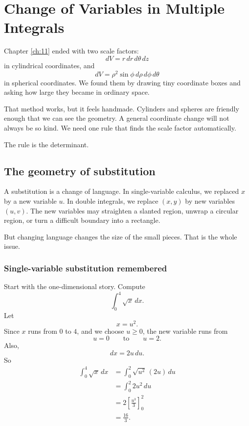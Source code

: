 
\chapter{Change of Variables in Multiple Integrals}
\label{ch:12}

Chapter \ref{ch:11} ended with two scale factors:
\[
    dV=r\,dr\,d\theta\,dz
\]
in cylindrical coordinates, and
\[
    dV=\rho^2\sin\phi\,d\rho\,d\phi\,d\theta
\]
in spherical coordinates.  We found them by drawing tiny coordinate boxes and asking
how large they became in ordinary space.

That method works, but it feels handmade.  Cylinders and spheres are friendly enough
that we can see the geometry.  A general coordinate change will not always be so kind.
We need one rule that finds the scale factor automatically.

The rule is the determinant.

\section{The geometry of substitution}
\label{sec:12.1}

A substitution is a change of language.  In single-variable calculus, we replaced \(x\)
by a new variable \(u\).  In double integrals, we replace \((x,y)\) by new variables
\((u,v)\).  The new variables may straighten a slanted region, unwrap a circular region,
or turn a difficult boundary into a rectangle.

But changing language changes the size of the small pieces.  That is the whole issue.

\subsection{Single-variable substitution remembered}

Start with the one-dimensional story.  Compute
\[
    \int_0^4 \sqrt{x}\,dx.
\]
Let
\[
    x=u^2.
\]
Since \(x\) runs from \(0\) to \(4\), and we choose \(u\ge0\), the new variable runs from
\[
    u=0
    \qquad\text{to}\qquad
    u=2.
\]
Also,
\[
    dx=2u\,du.
\]
So
\[
\begin{aligned}
    \int_0^4 \sqrt{x}\,dx
    &=
    \int_0^2 \sqrt{u^2}\,(2u)\,du\\
    &=
    \int_0^2 2u^2\,du\\
    &=
    2\left[\frac{u^3}{3}\right]_0^2\\
    &=
    \frac{16}{3}.
\end{aligned}
\]

